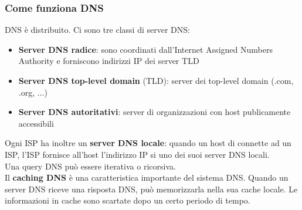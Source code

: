 \documentclass[11pt]{article}
\begin{document}
\subsubsection{Come funziona DNS}
DNS è distribuito. Ci sono tre classi di server DNS:
\begin{itemize}
    \item \textbf{Server DNS radice}: sono coordinati dall'Internet Assigned Numbers Authority e forniscono indirizzi IP
    dei server TLD
    \item \textbf{Server DNS top-level domain} (TLD): server dei top-level domain (.com, .org, ...)
    \item \textbf{Server DNS autoritativi}: server di organizzazioni con host publicamente accessibili
\end{itemize}
Ogni ISP ha inoltre un \textbf{server DNS locale}: quando un host di connette ad un ISP, l'ISP fornisce all'host l'indirizzo
IP si uno dei suoi server DNS locali.\\
Una query DNS può essere iterativa o ricorsiva.\\
Il \textbf{caching DNS} è una caratteristica importante del sistema DNS. Quando un server DNS riceve una risposta DNS, 
può memorizzarla nella sua cache locale. Le informazioni in cache sono scartate dopo un certo periodo di tempo.
\end{document}
